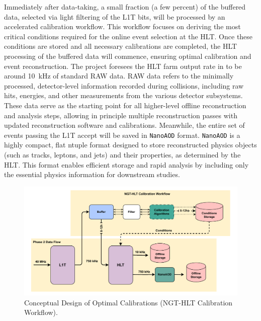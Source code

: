 Immediately after data-taking, a small fraction (a few percent) of the buffered data, selected via light filtering of the L1T bits, will be processed by an accelerated calibration workflow. 
This workflow focuses on deriving the most critical conditions required for the online event selection at the HLT.
Once these conditions are stored and all necessary calibrations are completed, the HLT processing of the buffered data will commence, ensuring optimal calibration and event reconstruction.
The \Rthree project foresees the HLT farm output rate in \Runfive to be around \SI{10}{\kilo\hertz} of standard RAW data. 
RAW data refers to the minimally processed, detector-level information recorded during collisions, including raw hits, energies, and other measurements from the various detector subsystems. 
These data serve as the starting point for all higher-level offline reconstruction and analysis steps, allowing in principle multiple reconstruction passes with updated reconstruction software and calibrations. 
Meanwhile, the entire set of events passing the L1T accept will be saved in \texttt{NanoAOD} format.
\texttt{NanoAOD} is a highly compact, flat ntuple format designed to store reconstructed physics objects (such as tracks, leptons, and jets) and their properties, as determined by the HLT. 
This format enables efficient storage and rapid analysis by including only the essential physics information for downstream studies.


\begin{figure}[h!]	
\centering
\includegraphics[width=\textwidth]{figures/NGT_Calibration_Workflow_updated.pdf}
\caption{Conceptual Design of \Rthree Optimal Calibrations (NGT-HLT Calibration Workflow).}
\label{fig:NGT-HLT_CalibrationWorkflow}
\end{figure}


